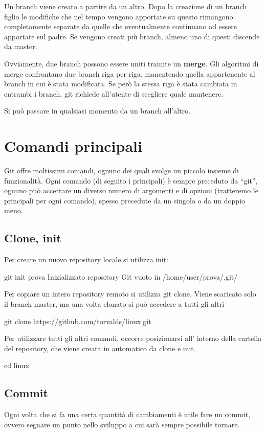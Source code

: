 \documentclass{article}
\begin{document}
Un branch viene creato a partire da un altro. Dopo la creazione di un branch
figlio le modifiche che nel tempo vengono apportate su questo rimangono
completamente separate da quelle che eventualmente continuano ad essere
apportate sul padre. Se vengono creati più branch, almeno uno di questi discende
da master.

Ovviamente, due branch possono essere uniti tramite un \textbf{merge}. Gli
algoritmi di merge confrontano due branch riga per riga, manentendo quella
appartenente al branch in cui è stata modificata. Se però la stessa riga è stata
cambiata in entrambi i branch, git richiede all'utente di scegliere quale
mantenere.

Si può passare in qualsiasi momento da un branch all'altro.

\section{Comandi principali}

Git offre moltissimi comandi, ognuno dei quali svolge un piccolo insieme di
funzionalità. Ogni comando (di seguito i principali) è sempre preceduto da
``git'', ognuno può accettare un diverso numero di argomenti e di opzioni
(tratteremo le principali per ogni comando), spesso precedute da un singolo o da
un doppio meno. 

\subsection{Clone, init}

Per creare un nuovo repository locale si utilizza init:

git init prova Inizializzato repository Git vuoto in /home/user/prova/.git/

Per copiare un intero repository remoto si utilizza git clone. Viene scaricato
solo il branch master, ma una volta clonato si può accedere a tutti gli altri

git clone https://github.com/torvalds/linux.git

Per utilizzare tutti gli altri comandi, occorre posizionarsi all' interno della
cartella del repository, che viene creata in automatico da clone e init.

cd linux

\subsection{Commit}

Ogni volta che si fa una certa quantità di cambiamenti è utile fare un commit,
ovvero segnare un punto nello sviluppo a cui sarà sempre possibile tornare. 
\end{document}
